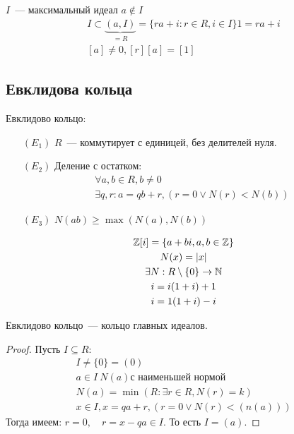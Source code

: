 \begin{example}
  $I$~--- максимальный идеал $a \notin I$ 
  \begin{gather}
    I \subset \underbrace{(a, I)}_{=R} = \{ra + i : r \in R, i \in I\}
    1 = ra + i \\
    [a] \neq 0, [r][a] = [1]
  \end{gather}
\end{example}

\subsection{Евклидова кольца}

\begin{definition}
  Евклидово кольцо:
  \begin{itemize}
    \item[$(E_1)$] $R$~--- коммутирует с единицей, без делителей нуля.
    \item[$(E_2)$] Деление с остатком:
    \begin{gather}
      \forall a, b \in R, b \neq 0 \\
      \exists q, r: a = qb + r,(r = 0 \lor N(r) < N(b)) 
    \end{gather}
    \item[$(E_3)$] $N(ab) \geq \max {(N(a), N(b))}$
  \end{itemize}
\end{definition}

\begin{example}
  \begin{gather}  
    \mathbb{Z}[i] = \{ a + bi, a, b \in \mathbb{Z} \} \\
    N(x) = |x| \\
    \exists N: R \setminus \{ 0\} \rightarrow \mathbb{N} \\
    i = i (1 + i) + 1 \\
    i = 1 (1 + i) - i
  \end{gather}
\end{example}

\begin{theorem}
  Евклидово кольцо~--- кольцо главных идеалов.
\end{theorem}

\begin{proof}
  Пусть $I \subseteq R$:
  \begin{gather}
    I \neq \{0\} = (0) \\
    a \in I \ N(a) \text{с наименьшей нормой} \\
    N(a) = \min (R: \exists r \in R, N(r) = k) \\
    x \in I, x = qa + r, (r = 0 \lor N(r) < (n(a)))
  \end{gather}
  Тогда имеем: $r = 0, \quad r = x - qa \in I$. То есть $I = (a)$.
\end{proof}
